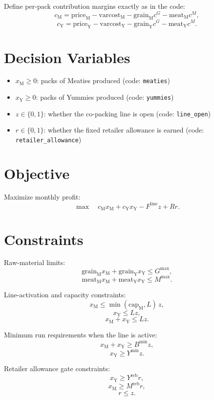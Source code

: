 Define per-pack contribution margins exactly as in the code:
\[
c_{\mathrm{M}}=\text{price}_{\mathrm{M}}-\text{varcost}_{\mathrm{M}}-\text{grain}_{\mathrm{M}}c^G-\text{meat}_{\mathrm{M}}c^M,
\]
\[
c_{\mathrm{Y}}=\text{price}_{\mathrm{Y}}-\text{varcost}_{\mathrm{Y}}-\text{grain}_{\mathrm{Y}}c^G-\text{meat}_{\mathrm{Y}}c^M.
\]

\section*{Decision Variables}

\begin{itemize}
    \item \(x_{\mathrm{M}} \ge 0\): packs of Meaties produced (code: \texttt{meaties})
    \item \(x_{\mathrm{Y}} \ge 0\): packs of Yummies produced (code: \texttt{yummies})
    \item \(z \in \{0,1\}\): whether the co-packing line is open (code: \texttt{line\_open})
    \item \(r \in \{0,1\}\): whether the fixed retailer allowance is earned (code: \texttt{retailer\_allowance})
\end{itemize}

\section*{Objective}

Maximize monthly profit:
\[
\max \quad c_{\mathrm{M}}x_{\mathrm{M}} + c_{\mathrm{Y}}x_{\mathrm{Y}} - F^{\text{line}} z + R r.
\]

\section*{Constraints}

Raw-material limits:
\[
\text{grain}_{\mathrm{M}}x_{\mathrm{M}} + \text{grain}_{\mathrm{Y}}x_{\mathrm{Y}} \le G^{\max},
\]
\[
\text{meat}_{\mathrm{M}}x_{\mathrm{M}} + \text{meat}_{\mathrm{Y}}x_{\mathrm{Y}} \le M^{\max}.
\]

Line-activation and capacity constraints:
\[
x_{\mathrm{M}} \le \min(\text{cap}_{\mathrm{M}},L)\, z,
\]
\[
x_{\mathrm{Y}} \le L z,
\]
\[
x_{\mathrm{M}} + x_{\mathrm{Y}} \le L z.
\]

Minimum run requirements when the line is active:
\[
x_{\mathrm{M}} + x_{\mathrm{Y}} \ge B^{\min} z,
\]
\[
x_{\mathrm{Y}} \ge Y^{\min} z.
\]

Retailer allowance gate constraints:
\[
x_{\mathrm{Y}} \ge Y^{\text{reb}} r,
\]
\[
x_{\mathrm{M}} \ge M^{\text{reb}} r,
\]
\[
r \le z.
\]

